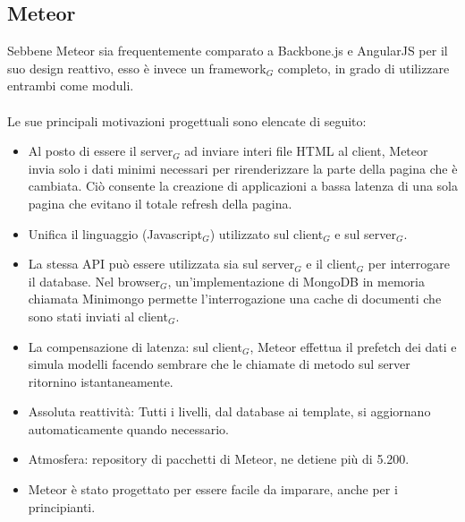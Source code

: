 \subsection{Meteor}

Sebbene Meteor sia frequentemente comparato a Backbone.js e AngularJS per il suo design reattivo, esso è invece un framework$_G$ completo, in grado di utilizzare entrambi come moduli.\\
\\
Le sue principali motivazioni progettuali sono elencate di seguito:

\begin{itemize}
	\item Al posto di essere il server$_G$ ad inviare interi file HTML al client, Meteor invia solo i dati minimi necessari per rirenderizzare la parte della pagina che è cambiata. Ciò consente la creazione di applicazioni a bassa latenza di una sola pagina che evitano il totale refresh della pagina.
	\item Unifica il linguaggio (Javascript$_G$) utilizzato sul client$_G$ e sul server$_G$.
	\item La stessa API può essere utilizzata sia sul server$_G$ e il client$_G$ per interrogare il database.
	Nel browser$_G$, un'implementazione di MongoDB in memoria chiamata Minimongo permette l'interrogazione una cache di documenti che sono stati inviati al client$_G$. 
	\item La compensazione di latenza: sul client$_G$, Meteor effettua il prefetch dei dati e simula modelli facendo sembrare che le chiamate di metodo sul server ritornino istantaneamente.
	\item Assoluta reattività: Tutti i livelli, dal database ai template, si aggiornano automaticamente quando necessario.
	\item Atmosfera: repository di pacchetti di Meteor, ne detiene più di 5.200.
	\item Meteor è stato progettato per essere facile da imparare, anche per i principianti.
\end{itemize}

